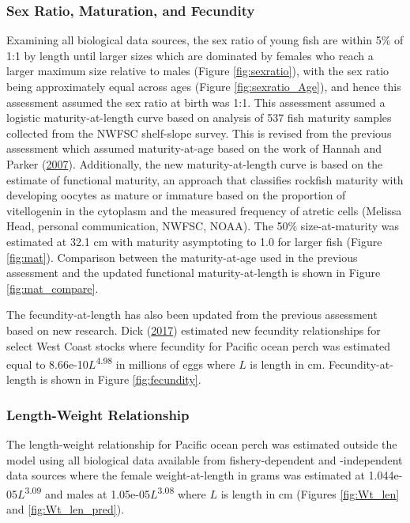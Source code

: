 \documentclass[12pt,]{article}
\begin{document}
\subsubsection{Sex Ratio, Maturation, and
Fecundity}\label{sex-ratio-maturation-and-fecundity}

Examining all biological data sources, the sex ratio of young fish are
within 5\% of 1:1 by length until larger sizes which are dominated by
females who reach a larger maximum size relative to males (Figure
\ref{fig:sexratio}), with the sex ratio being approximately equal across
ages (Figure \ref{fig:sexratio_Age}), and hence this assessment assumed
the sex ratio at birth was 1:1. This assessment assumed a logistic
maturity-at-length curve based on analysis of 537 fish maturity samples
collected from the NWFSC shelf-slope survey. This is revised from the
previous assessment which assumed maturity-at-age based on the work of
Hannah and Parker
(\protect\hyperlink{ref-hannah_age-modulated_2007}{2007}). Additionally,
the new maturity-at-length curve is based on the estimate of functional
maturity, an approach that classifies rockfish maturity with developing
oocytes as mature or immature based on the proportion of vitellogenin in
the cytoplasm and the measured frequency of atretic cells (Melissa Head,
personal communication, NWFSC, NOAA). The 50\% size-at-maturity was
estimated at 32.1 cm with maturity asymptoting to 1.0 for larger fish
(Figure \ref{fig:mat}). Comparison between the maturity-at-age used in
the previous assessment and the updated functional maturity-at-length is
shown in Figure \ref{fig:mat_compare}.

The fecundity-at-length has also been updated from the previous
assessment based on new research. Dick
(\protect\hyperlink{ref-dick_meta-analysis_2017}{2017}) estimated new
fecundity relationships for select West Coast stocks where fecundity for
Pacific ocean perch was estimated equal to
8.66e-10\(L\)\textsuperscript{4.98} in millions of eggs where \(L\) is
length in cm. Fecundity-at-length is shown in Figure
\ref{fig:fecundity}.

\subsubsection{Length-Weight
Relationship}\label{length-weight-relationship}

The length-weight relationship for Pacific ocean perch was estimated
outside the model using all biological data available from
fishery-dependent and -independent data sources where the female
weight-at-length in grams was estimated at
1.044e-05\(L\)\textsuperscript{3.09} and males at
1.05e-05\(L\)\textsuperscript{3.08} where \(L\) is length in cm (Figures
\ref{fig:Wt_len} and \ref{fig:Wt_len_pred}).
\end{document}
